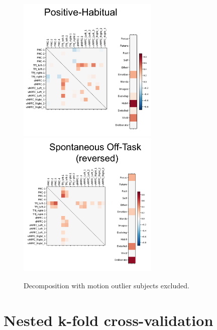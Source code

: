 \begin{figure}
	\centering
	\includegraphics[width=0.6\textwidth]{append/image/study1figs4-1.png}
	\includegraphics[width=0.6\textwidth]{append/image/study1figs4-2.png}
	\caption{Decomposition with motion outlier subjects excluded.}
	\label{fig:3S4}
\end{figure}
\chapter{Nested k-fold cross-validation}
\label{appendix:kfold}

